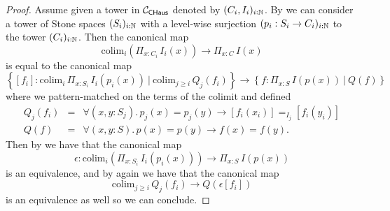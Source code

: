 \begin{proof}
Assume given a tower in ${\mathcal C}_{\mathsf{CHaus}}$ denoted by $(C_i,I_i)_{i:\mathbb{N}}$. By  we can consider a tower of Stone spaces $(S_i)_{i:\mathbb{N}}$ with a level-wise surjection $(p_i:S_i\to C_i)_{i:\mathbb{N}}$ to the tower $(C_i)_{i:\mathbb{N}}$.%
Then the canonical map
\[\mathrm{colim}_i(\Pi_{x:C_i}\,I_i(x) ) \to \Pi_{x:C}\,I(x)\]
is equal to the canonical map
%
\[ \left\{ [f_i] : \mathrm{colim}_i\, \Pi_{x:S_i}\, I_i(p_i(x))\ |\ \mathrm{colim}_{j\geq i}\, Q_j(f_i)\right\} \longrightarrow \left\{f:\Pi_{x:S}\, I(p(x))\ |\ Q(f)\right\} \]
where we pattern-matched on the terms of the colimit and defined
\begin{eqnarray}
  Q_j(f_i) &=& \forall(x,y:S_j).\, p_j(x)=p_j(y)\to [f_i(x_i)]=_{I_j}[f_i(y_i)]\nonumber\\
Q(f) &=& \forall(x,y:S).\, p(x)=p(y)\to f(x)=f(y).\nonumber
\end{eqnarray}
Then by  we have that the canonical map
\[\epsilon : \mathrm{colim}_i(\Pi_{x:S_i}\,I_i(p_i(x))) \to \Pi_{x:S}\, I(p(x))\]
is an equivalence, and by  again we have that the canonical map
\[\mathrm{colim}_{j\geq i}\,Q_j(f_i) \to Q(\epsilon[f_i])\]
is an equivalence as well so we can conclude.
\end{proof}



